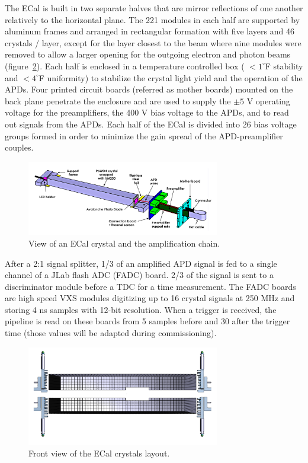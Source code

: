 \documentclass[12pt]{article}
\begin{document}
The ECal is built in two separate halves that are mirror reflections of one another relatively to the horizontal plane. The 221 modules in each half are supported by aluminum frames and arranged in rectangular formation with five layers and 46 crystals / layer, except for the layer closest to the beam where nine modules were removed to allow a larger opening for the outgoing electron and photon beams (figure~\ref{Crystals}). Each half is enclosed in a temperature controlled box ( $< 1^\circ$F stability and $< 4^\circ$F uniformity) to stabilize the crystal light yield and the operation of the APDs. Four printed circuit boards (referred as mother boards) mounted on the back plane penetrate the enclosure and are used to supply the $\pm5$ V operating voltage for the preamplifiers, the 400 V bias voltage to the APDs, and to read out signals from the APDs. Each half of the ECal is divided into 26 bias voltage groups formed in order to minimize the gain spread of the APD-preamplifier couples.

\begin{figure}[htpb]\center
\includegraphics[width=0.75\textwidth]{pics/CrystalAssembly.png}
\caption{\label{AmplChain} View of an ECal crystal and the amplification chain.}
\end{figure}
After a 2:1 signal splitter, 1/3 of an amplified APD signal is fed to a single channel of a JLab flash ADC (FADC) board. 2/3 of the signal is sent to a discriminator module before a TDC for a time measurement. The FADC boards are high speed VXS modules digitizing up to 16 crystal signals at 250 MHz and storing 4 ns samples with 12-bit resolution. When a trigger is received, the pipeline is read on these boards from 5 samples before and 30 after the trigger time (those values will be adapted during commissioning).

\begin{figure}[htpb]\center
\includegraphics[width=0.75\textwidth]{pics/ECal2.png}
\caption{ \label{Crystals} Front view of the ECal crystals layout.}
\end{figure}
\end{document}
